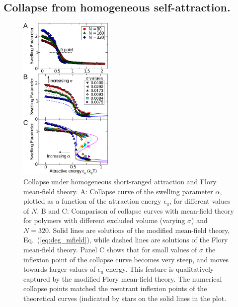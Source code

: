 \documentclass[
preprint,
a4paper,
12pt,
superscriptaddress,
pre]{revtex4}
\begin{document}

\subsection*{Collapse from homogeneous self-attraction. }


\begin{figure}
  \centering
  \includegraphics[width=0.4\textwidth]{fig2}
  \caption{Collapse under homogeneous short-ranged attraction and
    Flory mean-field theory. A: Collapse curve of the swelling parameter
    $\alpha$, plotted as a function of the attraction energy
    $\epsilon_u$, for different values of $N$. B and C: Comparison of
    collapse curves with mean-field theory for polymers with different
    excluded volume (varying $\sigma$) and $N=320$.  Solid lines are
    solutions of the modified mean-field theory,
    Eq.~(\ref{eq:deg_mfield}), while dashed lines are solutions of the
    Flory mean-field theory. Panel C shows that for small values of
    $\sigma$ the inflexion point of the collapse curve becomes very
    steep, and moves towards larger values of $\epsilon_u$
    energy. This feature is qualitatively captured by the modified Flory
    mean-field theory. The numerical collapse points
    matched the reentrant inflexion points of the theoretical curves
    (indicated by stars on the solid lines in the plot.  }
  \label{fig:2}
\end{figure}
\end{document}
